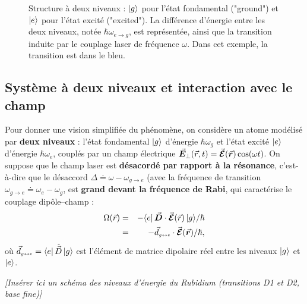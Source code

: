 \begin{figure}[!htb]
\begin{tikzpicture}
\end{tikzpicture}
\caption{Structure à deux niveaux : $\ket{g}$ pour l’état fondamental ("ground") et $\ket{e}$ pour l’état excité ("excited"). La différence d’énergie entre les deux niveaux, notée $\hbar \omega_{e \rightarrow g}$, est représentée, ainsi que la transition induite par le couplage laser de fréquence $\omega$. Dans cet exemple, la transition est dans le bleu.}

\end{figure}


\subsection{Système à deux niveaux et interaction avec le champ}

Pour donner une vision simplifiée du phénomène, on considère un atome modélisé par {\bf deux niveaux} : l’état fondamental \(\ket{g}\) d’énergie \(\hbar \omega_g\) et l’état excité \(\ket{e}\) d’énergie \(\hbar \omega_e\), couplés par un champ électrique 
\(\operatorvec{E}_\perp(\vec{r},t) = \operatorvec{\mathcal{E}}(\operatorvec{r}) \cos(\omega t)\). 
On suppose que le champ laser est {\bf désacordé par rapport à la résonance}, c’est-à-dire que le désaccord
\(
\Delta \doteq \omega - \omega_{\scriptscriptstyle g\rightarrow e}
\)
(avec la fréquence de transition \(\omega_{\scriptscriptstyle g\rightarrow e} \doteq \omega_e - \omega_g\),
est {\bf grand devant la fréquence de Rabi}, qui caractérise le couplage dipôle–champ :  
\begin{eqnarray}
	\Omega(\vec{r}) &=& - {\bra{e} \operatorvec{D} \cdot \operatorvec{\mathcal{E}}(\vec{r}) \ket{g}}/{\hbar} \label{chap7:eq.Omega.1} \\
	&=& - {\vec{d}_{\scriptscriptstyle g \leftrightarrow e} \cdot \operatorvec{\mathcal{E}}(\operatorvec{r})}/{\hbar}, \label{chap7:eq.Omega.2}
\end{eqnarray}
où \(\vec{d}_{\scriptscriptstyle g \leftrightarrow e} = \bra{e} \hat{\vec{D}} \ket{g}\) est l’élément de matrice dipolaire réel entre les niveaux \(\ket{g}\) et \(\ket{e}\).

\vspace{1em}
\begin{center}
\textit{[Insérer ici un schéma des niveaux d’énergie du Rubidium (transitions D1 et D2, base fine)]}
\end{center}


